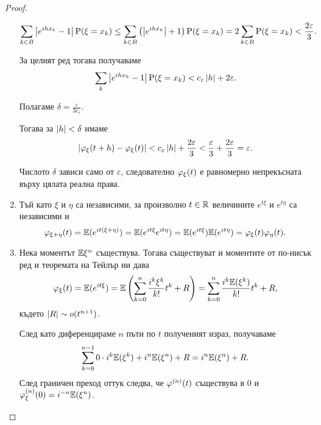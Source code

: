 \documentclass[numbers=endperiod, DIV=15, bibliography=totocnumbered]{scrartcl}
\begin{document}
\begin{proof}
\begin{enumerate}
    \begin{displaymath}
      \sum_{k \in B} \left\vert e^{ih x_k} - 1 \right\vert \operatorname{P}(\xi = x_k)
      \leq
      \sum_{k \in B} \left( \left\vert e^{ih x_k} \right\vert + 1 \right) \operatorname{P}(\xi = x_k)
      =
      2 \sum_{k \in B} \operatorname{P}(\xi = x_k)
      <
      \frac {2\varepsilon} 3.
    \end{displaymath}

    За целият ред тогава получаваме
    \begin{displaymath}
      \sum_k \left\vert e^{ih x_k} - 1 \right\vert \operatorname{P}(\xi = x_k)
      <
      c_\varepsilon \left\vert h \right\vert + 2 \varepsilon.
    \end{displaymath}

    Полагаме $\delta = \frac \varepsilon {3 c_\varepsilon}$.

    Тогава за $\left\vert h \right\vert < \delta$ имаме
    \begin{displaymath}
      \left\vert \varphi_\xi(t + h) - \varphi_\xi(t) \right\vert
      <
      c_\varepsilon \left\vert h \right\vert + \frac {2\varepsilon} 3
      <
      \frac {\varepsilon} 3 + \frac {2\varepsilon} 3
      =
      \varepsilon.
    \end{displaymath}

    Числото $\delta$ зависи само от $\varepsilon$, следователно $\varphi_\xi(t)$ е равномерно непрекъсната върху цялата реална права.

    \item Тъй като $\xi$ и $\eta$ са независими, за произволно $t \in \mathbb{R}$ величините $e^{t\xi}$ и $e^{t\eta}$ са независими и
    \begin{displaymath}
      \varphi_{\xi + \eta}(t)
      =
      \mathbb{E}(e^{it(\xi + \eta)})
      =
      \mathbb{E}(e^{it\xi} e^{it\eta})
      =
      \mathbb{E}(e^{it\xi}) \mathbb{E}(e^{it\eta})
      =
      \varphi_\xi(t) \varphi_\eta(t).
    \end{displaymath}

    \item Нека моментът $\mathbb{E} \xi^n$ съществува. Тогава съществуват и моментите от по-нисък ред и теоремата на Тейлър ни дава
    \begin{displaymath}
      \varphi_\xi(t)
      =
      \mathbb{E}(e^{it\xi})
      =
      \mathbb{E} \left( \sum_{k=0}^n \frac {i^k \xi^k} {k!} t^k + R \right)
      =
      \sum_{k=0}^n \frac {i^k \mathbb{E}(\xi^k)} {k!} t^k + R,
    \end{displaymath}
    където $\left\vert R \right\vert \sim o(t^{n+1})$.

    След като диференцираме $n$ пъти по $t$ полученият израз, получаваме
    \begin{displaymath}
      \sum_{k=0}^{n-1} 0 \cdot i^k \mathbb{E}(\xi^k) + i^n \mathbb{E}(\xi^n) + R
      =
      i^n \mathbb{E}(\xi^n) + R.
    \end{displaymath}
    След граничен преход оттук следва, че $\varphi^{(n)}(t)$ съществува в $0$ и $\varphi^{(n)}_\xi(0) = i^{-n} \mathbb{E}(\xi^n)$.


\end{enumerate}
\end{proof}
\end{document}
